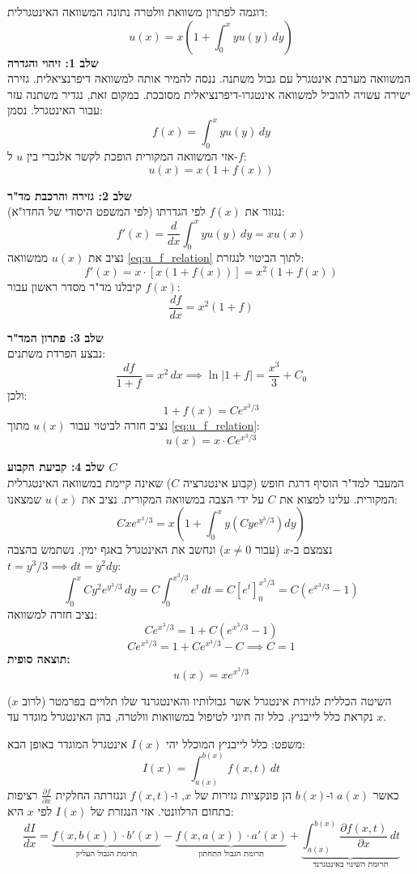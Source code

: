 \begin{examplebox}{דוגמה לפתרון משוואת וולטרה}
נתונה המשוואה האינטגרלית:
\[
u(x) = x \left( 1 + \int_{0}^{x} y u(y) \, dy \right)
\]
\textbf{שלב 1: זיהוי והגדרה} \\
המשוואה מערבת אינטגרל עם גבול משתנה. ננסה להמיר אותה למשוואה דיפרנציאלית. גזירה ישירה עשויה להוביל למשוואה אינטגרו-דיפרנציאלית מסובכת. במקום זאת, נגדיר משתנה עזר עבור האינטגרל.
נסמן:
\[
f(x) = \int_{0}^{x} y u(y) \, dy
\]
אזי המשוואה המקורית הופכת לקשר אלגברי בין $u$ ל-$f$:
\begin{equation} \label{eq:u_f_relation}
u(x) = x(1 + f(x))
\end{equation}

\textbf{שלב 2: גזירה והרכבת מד"ר} \\
נגזור את $f(x)$ לפי הגדרתו (לפי המשפט היסודי של החדו"א):
\[
f'(x) = \frac{d}{dx} \int_{0}^{x} y u(y) \, dy = x u(x)
\]
נציב את $u(x)$ ממשוואה \eqref{eq:u_f_relation} לתוך הביטוי לנגזרת:
\[
f'(x) = x \cdot [x(1 + f(x))] = x^2 (1 + f(x))
\]
קיבלנו מד"ר מסדר ראשון עבור $f(x)$:
\[
\frac{df}{dx} = x^2 (1+f)
\]

\textbf{שלב 3: פתרון המד"ר} \\
נבצע הפרדת משתנים:
\[
\frac{df}{1+f} = x^2 \, dx \implies \ln|1+f| = \frac{x^3}{3} + C_0
\]
ולכן:
\[
1 + f(x) = C e^{x^3/3}
\]
נציב חזרה לביטוי עבור $u(x)$ מתוך \eqref{eq:u_f_relation}:
\[
u(x) = x \cdot C e^{x^3/3}
\]

\textbf{שלב 4: קביעת הקבוע $C$} \\
המעבר למד"ר הוסיף דרגת חופש (קבוע אינטגרציה $C$) שאינה קיימת במשוואה האינטגרלית המקורית. עלינו למצוא את $C$ על ידי הצבה במשוואה המקורית.
נציב את $u(x)$ שמצאנו:
\[
C x e^{x^3/3} = x \left( 1 + \int_{0}^{x} y \left( C y e^{y^3/3} \right) dy \right)
\]
נצמצם ב-$x$ (עבור $x \neq 0$) ונחשב את האינטגרל באגף ימין. נשתמש בהצבה $t = y^3/3 \implies dt = y^2 dy$:
\[
\int_{0}^{x} C y^2 e^{y^3/3} \, dy = C \int_{0}^{x^3/3} e^t \, dt = C \left[ e^t \right]_0^{x^3/3} = C (e^{x^3/3} - 1)
\]
נציב חזרה למשוואה:
\[
C e^{x^3/3} = 1 + C (e^{x^3/3} - 1)
\]
\[
C e^{x^3/3} = 1 + C e^{x^3/3} - C \implies C = 1
\]
\textbf{תוצאה סופית:}
\[
u(x) = x e^{x^3/3}
\]
\end{examplebox}



השיטה הכללית לגזירת אינטגרל אשר גבולותיו והאינטגרנד שלו תלויים בפרמטר (לרוב $x$) נקראת כלל לייבניץ. כלל זה חיוני לטיפול במשוואות וולטרה, בהן האינטגרל מוגדר עד $x$.

\begin{theorembox}{משפט: כלל לייבניץ המוכלל}
יהי $I(x)$ אינטגרל המוגדר באופן הבא:
\[
I(x) = \int_{a(x)}^{b(x)} f(x,t) \, dt
\]
כאשר $a(x)$ ו-$b(x)$ הן פונקציות גזירות של $x$, ו-$f(x,t)$ ונגזרתה החלקית $\frac{\partial f}{\partial x}$ רציפות בתחום הרלוונטי.
אזי הנגזרת של $I(x)$ לפי $x$ היא:
\[
\frac{dI}{dx} = \underbrace{f(x, b(x)) \cdot b'(x)}_{\text{תרומת הגבול העליון}} - \underbrace{f(x, a(x)) \cdot a'(x)}_{\text{תרומת הגבול התחתון}} + \underbrace{\int_{a(x)}^{b(x)} \frac{\partial f(x,t)}{\partial x} \, dt}_{\text{תרומת השינוי באינטגרנד}}
\]
\end{theorembox}

